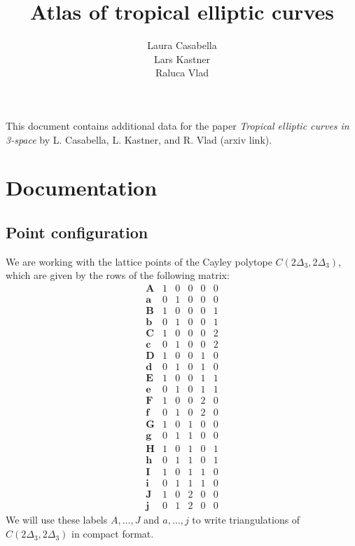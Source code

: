 \documentclass[a4paper, DIV=17, twocolumn]{scrartcl}
\title{Atlas of tropical elliptic curves}
\author{Laura Casabella\\Lars Kastner\\Raluca Vlad}
\begin{document}
\maketitle
This document contains additional data for the paper \emph{Tropical elliptic curves in 3-space} by L. Casabella, L. Kastner, and R. Vlad (arxiv link). 
\tableofcontents
\section{Documentation}
\subsection{Point configuration}
We are working with the lattice points of the Cayley polytope $C(2\Delta_3,2\Delta_3)$, which are given by the rows of the following matrix:
\[
   \begin{array}{c|ccccc}
      \textbf{A} & 1 & 0 & 0 & 0 & 0 \\
      \textbf{a} & 0 & 1 & 0 & 0 & 0 \\
      \textbf{B} & 1 & 0 & 0 & 0 & 1 \\
      \textbf{b} & 0 & 1 & 0 & 0 & 1 \\
      \textbf{C} & 1 & 0 & 0 & 0 & 2 \\
      \textbf{c} & 0 & 1 & 0 & 0 & 2 \\
      \textbf{D} & 1 & 0 & 0 & 1 & 0 \\
      \textbf{d} & 0 & 1& 0 & 1 & 0 \\
      \textbf{E} & 1 & 0 & 0 & 1 & 1 \\
      \textbf{e} & 0 & 1 & 0 & 1 & 1 \\
      \textbf{F} & 1 & 0 & 0 & 2 & 0 \\
      \textbf{f} & 0 & 1 & 0 & 2 & 0 \\
      \textbf{G} & 1 & 0& 1 & 0 & 0 \\
      \textbf{g} & 0 & 1 & 1 & 0 & 0 \\
      \textbf{H} & 1 & 0 & 1 & 0 & 1 \\
      \textbf{h} & 0 & 1 & 1 & 0 & 1 \\
      \textbf{I} & 1 & 0 & 1 & 1 & 0 \\
      \textbf{i} & 0 & 1 & 1 & 1 & 0 \\
      \textbf{J} & 1 & 0 & 2 & 0 & 0 \\
      \textbf{j} & 0 & 1 & 2 & 0 & 0
   \end{array}
\]
We will use these labels $A,\dots, J$ and $a,\dots, j$
to write triangulations of $C(2\Delta_3,2\Delta_3)$ in compact format. 
\end{document}
